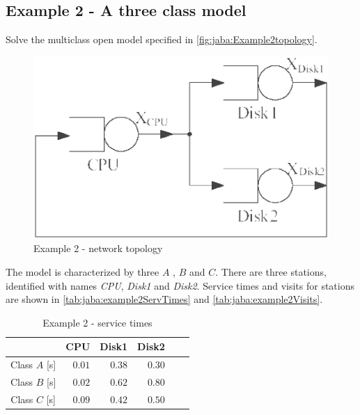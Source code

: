 \subsection{Example 2 - A three class model}
\label{sec:jaba:example2} Solve the multiclass open model specified
in \autoref{fig:jaba:Example2topology}.
\begin{figure}[htbp]
    \begin{center}
        \includegraphics[scale=.35]{img/jaba/example2}
    \end{center}
    \caption{Example 2 - network topology}
    \label{fig:jaba:Example2topology}
\end{figure}
The model is characterized by three $A$ , $B$ and $C$.
There are three
stations, identified with names \emph{CPU},
\emph{Disk1} and \emph{Disk2}. Service times and visits for stations
are shown in \autoref{tab:jaba:example2ServTimes} and \autoref{tab:jaba:example2Visits}.

\begin{table}[htbp]
\begin{center}
\begin{tabular}{c|r|r|r|r|r|}
& \multicolumn{1}{c|}{CPU} & \multicolumn{1}{c|}{Disk1} & \multicolumn{1}{c|}{Disk2} \\
\hline
Class $A$ [s]& $0.01$ & $0.38$ & $0.30$ \\
Class $B$ [s]& $0.02$ & $0.62$ & $0.80$ \\
Class $C$ [s]& $0.09$ & $0.42$ & $0.50$ \\
\hline
\end{tabular}
\end{center}
\caption{Example 2 - service times}
\label{tab:jaba:example2ServTimes}
\end{table}

